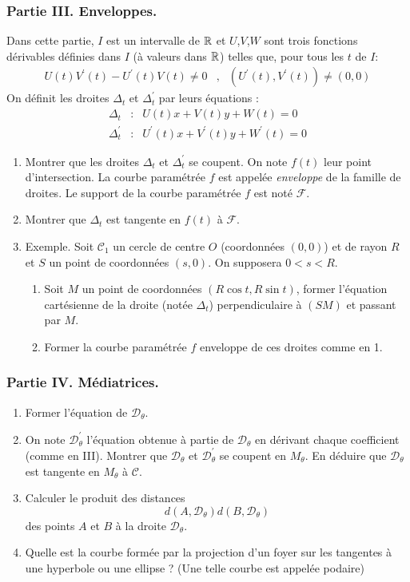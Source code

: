 \subsubsection*{Partie III. Enveloppes.}
Dans cette partie, $I$ est un intervalle de $\mathbb{R}$ et $U$,$V$,$W$ sont trois fonctions dérivables définies dans $I$ (à valeurs dans $\mathbb{R}$) telles que, pour tous les $t$ de $I$:
\begin{align*}
 U(t)V^\prime (t) - U^\prime (t)V(t)\neq 0 &,& (U^\prime (t),V^\prime(t))\neq (0,0)
\end{align*}
 On définit les droites $\Delta_t$ et $\Delta^\prime _t$ par leurs équations :
\begin{align*}
 \Delta_t &:& U(t)x+V(t)y+W(t)=0 \\
\Delta^\prime_t &:& U^\prime(t)x+V^\prime(t)y+W^\prime(t)=0 
\end{align*}
\begin{enumerate}
 \item Montrer que les droites $\Delta_t$ et $\Delta^\prime_t$ se coupent. On note $f(t)$ leur point d'intersection. La courbe paramétrée $f$ est appelée \emph{enveloppe} de la famille de droites. Le support de la courbe paramétrée $f$ est noté $\mathcal F$.
\item Montrer que $\Delta_t$ est tangente en $f(t)$ à $\mathcal F$.
\item Exemple. Soit $\mathcal C_1$ un cercle de centre $O$ (coordonnées $(0,0)$) et de rayon $R$ et $S$ un point de coordonnées $(s,0)$. On supposera $0<s<R$.
\begin{enumerate}
\item Soit $M$ un point de coordonnées $(R\cos t, R\sin t)$, former l'équation cartésienne de la droite (notée $\Delta_t$) perpendiculaire à $(SM)$ et passant par $M$.
\item Former la courbe paramétrée $f$ enveloppe de ces droites comme en 1.
\end{enumerate}
\end{enumerate}
\subsubsection*{Partie IV. Médiatrices.}
\begin{enumerate}
 \item Former l'équation de $\mathcal D _\theta$.
\item On note $\mathcal{D}^\prime _\theta$ l'équation obtenue à partie de $\mathcal D _\theta$ en dérivant chaque coefficient (comme en III). Montrer que $\mathcal D _\theta$ et $\mathcal D ^\prime _\theta$ se coupent en $M_\theta$. En déduire que $\mathcal D _\theta$ est tangente en $M_\theta$ à $\mathcal C$.
\item Calculer le produit des distances
\begin{displaymath}
 d(A,\mathcal D _\theta)d(B,\mathcal D _\theta)
\end{displaymath}
 des points $A$ et $B$ à la droite $\mathcal D _\theta$.
\item Quelle est la courbe formée par la projection d'un foyer sur les tangentes à une hyperbole ou une ellipse ? (Une telle courbe est appelée podaire)
\end{enumerate}

